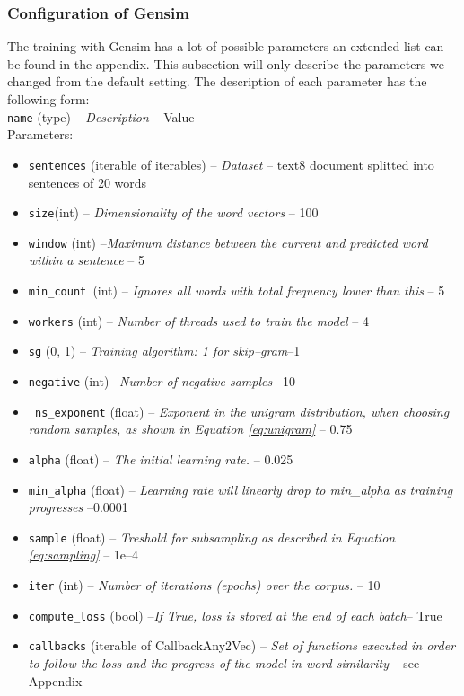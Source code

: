 \subsubsection{Configuration of Gensim}
The training with Gensim has a lot of possible parameters an extended list can be found in the appendix. This subsection will only describe the parameters we changed from the default setting. The description of each parameter has the following form: \\
\texttt{name} (type) -- \textit{Description} -- Value\\
Parameters:
\begin{itemize}
\item \texttt{sentences} (iterable of iterables) -- \textit{Dataset} -- text8 document splitted into sentences of 20 words
\item \texttt{size}(int) – \textit{Dimensionality of the word vectors } -- 100
\item \texttt{window} (int) --\textit {Maximum distance between the current and predicted word within a sentence }-- 5
\item \texttt{min\_count }(int) --\textit{ Ignores all words with total frequency lower than this }-- 5
\item \texttt{workers} (int) -- \textit{ Number of threads used to train the model} -- 4
\item \texttt{sg} ({0, 1}) --\textit{ Training algorithm: 1 for skip--gram}--1
\item \texttt{negative} (int) --\textit{Number of negative samples}-- 10
\item \texttt{ ns\_exponent} (float) --\textit{ Exponent in the unigram distribution, when choosing random samples, as shown in Equation \ref{eq:unigram} }-- 0.75
\item \texttt{alpha} (float) --\textit{ The initial learning rate. }-- 0.025
\item \texttt{min\_alpha} (float) --\textit{ Learning rate will linearly drop to min\_alpha as training progresses }--0.0001
\item \texttt{sample} (float) --\textit{ Treshold for subsampling as described in Equation \ref{eq:sampling}} -- 1e--4
\item \texttt{iter} (int) --\textit{ Number of iterations (epochs) over the corpus. }-- 10
\
\item \texttt{compute\_loss} (bool) --\textit{If True, loss is stored at the end of each batch}-- True
\item \texttt{callbacks} (iterable of CallbackAny2Vec) --\textit{ Set of functions executed in order to follow the loss and the progress of the model in word similarity }-- see Appendix
\end{itemize}

